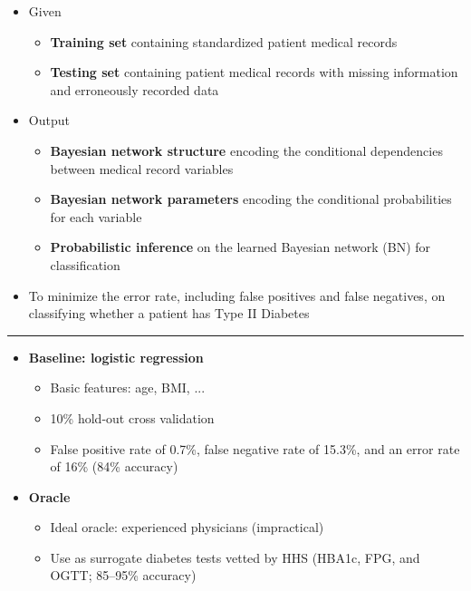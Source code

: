 \documentclass[a0]{a0poster}
\def\Head#1{\noindent{\LARGE\color{bluegray} #1}\bigskip}
\begin{document}
\begin{textblock}{7.0}
\begin{itemize}
  \item Given
  \begin{itemize}
    \item \textbf{Training set} containing standardized patient medical records
    \item \textbf{Testing set} containing patient medical records with missing information and erroneously recorded data
  \end{itemize}

  \item Output
  \begin{itemize}
    \item \textbf{Bayesian network structure} encoding the conditional dependencies between medical record variables
    \item \textbf{Bayesian network parameters} encoding the conditional probabilities for each variable
    \item \textbf{Probabilistic inference} on the learned Bayesian network (BN) for classification
  \end{itemize}

  \item To minimize the error rate, including false positives and false negatives, on classifying whether a patient has Type II Diabetes

\end{itemize}

\medskip
\hrule\medskip
\Head{Evaluation Criteria}

\begin{figure}[!h]
  \centering
  \label{fig2}
\end{figure}

\begin{multicols}{2}
  \begin{itemize}
    
    \item \textbf{Baseline: logistic regression}
    \begin{itemize}
      \item Basic features: age, BMI, ...
      \item 10\% hold-out cross validation
      \item False positive rate of 0.7\%, false negative rate of 15.3\%, and an error rate of 16\% (84\% accuracy)
    \end{itemize}

    \item \textbf{Oracle}
    \begin{itemize}
      \item Ideal oracle: experienced physicians (impractical)
      \item Use as surrogate diabetes tests vetted by HHS (HBA1c, FPG, and OGTT; 85--95\% accuracy)
    \end{itemize}

  \end{itemize}
\end{multicols}

\end{textblock}
\end{document}

